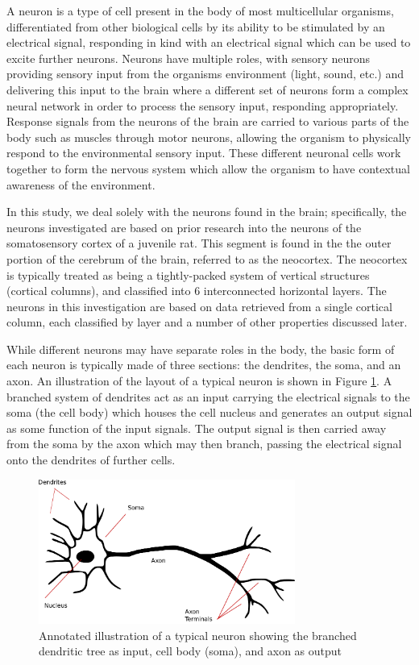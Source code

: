 A neuron is a type of cell present in the body of most multicellular organisms, differentiated from other biological cells by its ability to be stimulated by an electrical signal, responding in kind with an electrical signal which can be used to excite further neurons. Neurons have multiple roles, with sensory neurons providing sensory input from the organisms environment (light, sound, etc.) and delivering this input to the brain where a different set of neurons form a complex neural network in order to process the sensory input, responding appropriately. Response signals from the neurons of the brain are carried to various parts of the body such as muscles through motor neurons, allowing the organism to physically respond to the environmental sensory input. These different neuronal cells work together to form the nervous system which allow the organism to have contextual awareness of the environment. \par

In this study, we deal solely with the neurons found in the brain; specifically, the neurons investigated are based on prior research into the neurons of the somatosensory cortex of a juvenile rat. This segment is found in the the outer portion of the cerebrum of the brain, referred to as the neocortex. The neocortex is typically treated as being a tightly-packed system of vertical structures (cortical columns), and classified into 6 interconnected horizontal layers. The neurons in this investigation are based on data retrieved from a single cortical column, each classified by layer and a number of other properties discussed later.
\par
While different neurons may have separate roles in the body, the basic form of each neuron is typically made of three sections: the dendrites, the soma, and an axon. An illustration of the layout of a typical neuron is shown in Figure \ref{neuronOverview}. A branched system of dendrites act as an input carrying the electrical signals to the soma (the cell body) which houses the cell nucleus and generates an output signal as some function of the input signals. The output signal is then carried away from the soma by the axon which may then branch, passing the electrical signal onto the dendrites of further cells.\\

\begin{figure}
    \centering
    \includegraphics[width=0.75\textwidth]{02-Background/neuron_annotated.png}
    \caption{ Annotated illustration of a typical neuron \cite{neuronAnnotated} showing the branched dendritic tree as input, cell body (soma), and axon as output }
    \label{neuronOverview}
\end{figure}

